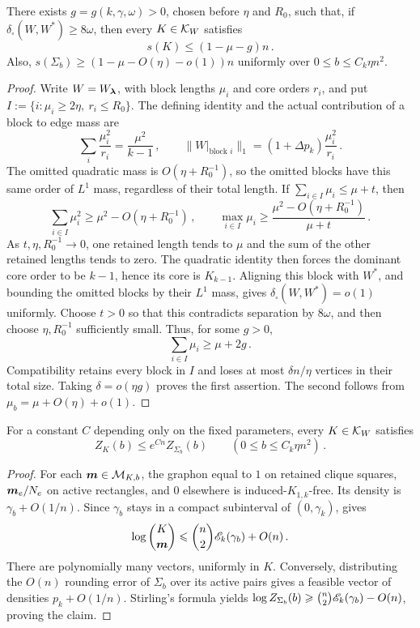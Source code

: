 \begin{lemma}\label{lemma:sub-retained-mass-gap-K1k}
There exists $g=g(k,\gamma,\omega)>0$, chosen before $\eta$ and $R_0$, such that, if $\delta_\square(W,W^\ast)\geq8\omega$, then every $K\in{\mathcal K}_W$ satisfies
$$s(K)\leq(1-\mu-g)n\,.$$
Also, $s(\Sigma_b)\geq(1-\mu-O(\eta)-o(1))n$ uniformly over $0\leq b\leq C_k\eta n^2$.
\end{lemma}
\begin{proof}
Write $W=W_{\boldsymbol{\lambda}}$, with block lengths $\mu_i$ and core orders $r_i$, and put $I:=\{i:\mu_i\geq2\eta,\ r_i\leq R_0\}$. The defining identity and the actual contribution of a block to edge mass are
$$\sum_i\frac{\mu_i^2}{r_i}=\frac{\mu^2}{k-1}\,,\qquad \|W|_{\text{block }i}\|_1=(1+\Delta p_k)\frac{\mu_i^2}{r_i}\,.$$
The omitted quadratic mass is $O(\eta+R_0^{-1})$, so the omitted blocks have this same order of $L^1$ mass, regardless of their total length. If $\sum_{i\in I}\mu_i\leq\mu+t$, then
$$\sum_{i\in I}\mu_i^2\geq\mu^2-O(\eta+R_0^{-1})\,,\qquad \max_{i\in I}\mu_i\geq\frac{\mu^2-O(\eta+R_0^{-1})}{\mu+t}\,.$$
As $t,\eta,R_0^{-1}\to0$, one retained length tends to $\mu$ and the sum of the other retained lengths tends to zero. The quadratic identity then forces the dominant core order to be $k-1$, hence its core is $K_{k-1}$. Aligning this block with $W^\ast$, and bounding the omitted blocks by their $L^1$ mass, gives $\delta_\square(W,W^\ast)=o(1)$ uniformly. Choose $t>0$ so that this contradicts separation by $8\omega$, and then choose $\eta,R_0^{-1}$ sufficiently small. Thus, for some $g>0$,
\begin{equation}\label{eqn:sub-graphon-retained-mass-gap-K1k}
\sum_{i\in I}\mu_i\geq\mu+2g\,.
\end{equation}
Compatibility retains every block in $I$ and loses at most $\delta n/\eta$ vertices in their total size. Taking $\delta=o(\eta g)$ proves the first assertion. The second follows from $\mu_b=\mu+O(\eta)+o(1)$.
\end{proof}

\begin{lemma}\label{lemma:clean-retained-comparison-K1k}
For a constant $C$ depending only on the fixed parameters, every $K\in{\mathcal K}_W$ satisfies
$$Z_K(b)\leq e^{Cn}Z_{\Sigma_b}(b)\qquad(0\leq b\leq C_k\eta n^2)\,.$$
\end{lemma}
\begin{proof}
For each $\boldsymbol{m}\in{\mathcal M}_{K,b}$, the graphon equal to $1$ on retained clique squares, $\boldsymbol{m}_e/N_e$ on active rectangles, and $0$ elsewhere is induced-$K_{1,k}$-free. Its density is $\gamma_b+O(1/n)$. Since $\gamma_b$ stays in a compact subinterval of $(0,\gamma_k)$,  gives
$$\log\binom{K}{\boldsymbol{m}}\leqslant\binom n2{\mathscr E}_k(\gamma_b)+O(n)\,.$$
There are polynomially many vectors, uniformly in $K$. Conversely, distributing the $O(n)$ rounding error of $\Sigma_b$ over its active pairs gives a feasible vector of densities $p_k+O(1/n)$. Stirling's formula yields $\log Z_{\Sigma_b}(b)\geqslant\binom n2{\mathscr E}_k(\gamma_b)-O(n)$, proving the claim.
\end{proof}

